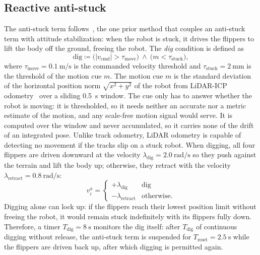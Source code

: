 \subsection{Reactive anti-stuck}\label{sec:method-antistuck}
The anti-stuck term follows~\cite{azayev2022}, the one prior method that couples an anti-stuck term with attitude stabilization: when the robot is stuck, it drives the
flippers to lift the body off the ground, freeing the robot. The \emph{dig} condition is defined as
\begin{equation}
    \text{dig} \coloneqq \big(|v_\text{cmd}|>\tau_\text{move}\big)\ \wedge\
  \big(m<\tau_\text{stuck}\big),
  \label{eq:stuck}
\end{equation}
where $\tau_\text{move}=\SI{0.1}{\metre\per\second}$ is the commanded velocity threshold and $\tau_\text{stuck}=\SI{2}{\milli\metre}$ is the threshold of the motion cue $m$.
The motion cue $m$ is the standard deviation of the horizontal position norm
$\sqrt{x^2+y^2}$ of the robot from LiDAR-ICP
odometry~\cite{libpointmatcher} over a sliding \SI{0.5}{\second} window. The cue only has
to answer whether the robot is moving: it is thresholded, so it needs neither an accurate
nor a metric estimate of the motion, and any scale-free motion signal would serve. It is
computed over the window and never accumulated, so it carries none of the drift of an
integrated pose. Unlike track odometry, LiDAR odometry is capable of detecting no movement if the tracks slip
on a stuck robot. When digging,
all four flippers are driven downward at the velocity
$\lambda_\text{dig}=\SI{2.0}{\radian\per\second}$ so they push against the terrain and lift
the body up; otherwise, they retract with the velocity
$\lambda_\text{retract}=\SI{0.8}{\radian\per\second}$:
\begin{equation}
  v^{\mathrm{a}}_i = \begin{cases} +\lambda_\text{dig} & \text{dig}\\ -\lambda_\text{retract} & \text{otherwise.}\end{cases}
  \label{eq:spread}
\end{equation}
Digging alone can lock up: if the flippers reach their lowest position limit without
freeing the robot, it would remain stuck indefinitely with its flippers fully down.
Therefore, a timer $T_\text{dig}=\SI{8}{\second}$ monitors the dig itself: after $T_\text{dig}$ of continuous digging without release, the anti-stuck term
is suspended for $T_\text{reset}=\SI{2.5}{\second}$ while the flippers are driven back up, after which digging is permitted again.

